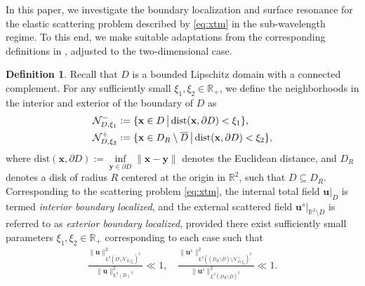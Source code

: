 \documentclass[11pt,reqno,twoside]{amsart}
\theoremstyle{definition}
\newtheorem{defn}{Definition}[section]
\theoremstyle{remark}
\numberwithin{equation}{section}
\begin{document}
In this paper, we investigate the boundary localization and surface resonance for the elastic scattering problem described by \eqref{eq:xtm} in the sub-wavelength regime. To this end, we make suitable adaptations from the corresponding definitions in \cite{DTL}, adjusted to the two-dimensional case. 
\begin{defn}\label{def:surface localized}
	Recall that $D$ is a bounded Lipschitz domain with a connected complement. For any sufficiently small $\xi_{1}, \xi_{2} \in \mathbb{R}_{+}$, we define the neighborhoods in the interior and exterior of the boundary of $D$ as
	\begin{align}\label{eq:Mdef}
		\mathcal{N}_{D,\xi_{1}}^{-} &:= \{ \mathbf{x} \in D \,\big|\, \mathrm{dist}(\mathbf{x}, \partial D) < \xi_{1} \}, \\
		\mathcal{N}_{D,\xi_{2}}^{+} &:= \{ \mathbf{x} \in  D_R \setminus \overline{D} \,\big|\, \mathrm{dist}(\mathbf{x}, \partial D) < \xi_{2} \},\notag
	\end{align}
	where $\mathrm{dist}(\mathbf{x}, \partial D) := \inf\limits_{\mathbf{y} \in  \partial D} \|\mathbf{x} - \mathbf{y}\|$ denotes the Euclidean distance, and $D_R$ denotes a disk of radius $R$ centered at the origin in $\mathbb{R}^2$, such that $D \subseteq D_R$. Corresponding to the scattering problem \eqref{eq:xtm}, the internal total field $\mathbf{u}|_{D}$ is termed {\it interior boundary localized}, and the external scattered field $\mathbf{u}^s|_{\mathbb{R}^2 \setminus \overline{D}}$ is referred to as {\it exterior boundary localized}, provided there exist sufficiently small parameters $\xi_{1},\xi_{2}  \in \mathbb{R}_{+}$ corresponding to each case such that
	\begin{align}\label{eq:def2.1}
		\frac{\|\mathbf{u}\|_{L^{2}(D \setminus \mathcal{N}_{D,\xi_{1}}^{-})^{2}}^{2}}{\|\mathbf{u}\|_{L^{2}(D)^2}^{2}} \ll 1,
		\quad
		\frac{\|\mathbf{u}^{s}\|_{L^{2}(\left(D_R \setminus \overline{D}\right) \setminus \mathcal{N}_{D,\xi_{2}}^{+})^2}^{2}}{\|\mathbf{u}^{s}\|_{L^{2}(D_R \setminus \overline{D})^2}^{2}} \ll 1.
	\end{align}
\end{defn}
\end{document}
